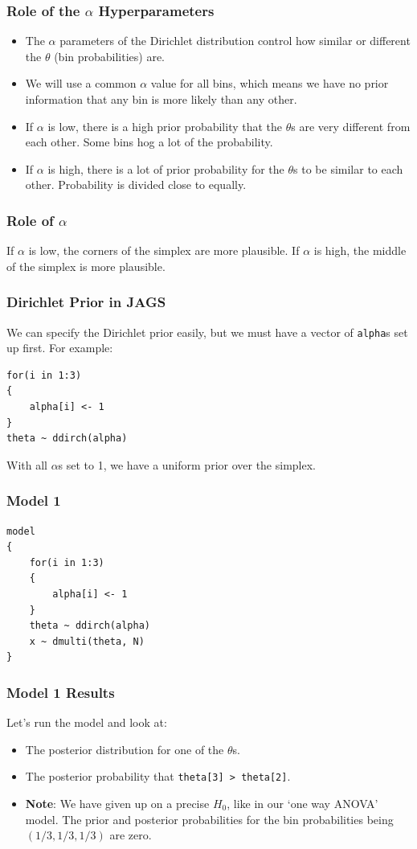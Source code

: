 \documentclass{beamer}
\begin{document}
\begin{frame}[fragile]
\frametitle{Role of the $\alpha$ Hyperparameters}
\begin{itemize}
\item The $\alpha$ parameters of the Dirichlet distribution control how similar
or different the $\theta$ (bin probabilities) are.\pause
\item We will use a common $\alpha$ value for all bins, which means we have no
prior information that any bin is more likely than any other.\pause
\item If $\alpha$ is low, there is a high prior probability that the $\theta$s
are very different from each other. Some bins hog a lot of the probability.\pause
\item If $\alpha$ is high, there is a lot of prior probability for the
$\theta$s to be similar to each other. Probability is divided close to equally.
\end{itemize}


\end{frame}


\begin{frame}[fragile]
\frametitle{Role of $\alpha$}
If $\alpha$ is low, the corners of the simplex are more plausible.
If $\alpha$ is high, the middle of the simplex is more plausible.
\end{frame}

\begin{frame}[fragile]
\frametitle{Dirichlet Prior in JAGS}
We can specify the Dirichlet prior easily, but we must have a vector of
\texttt{alpha}s set up first. For example:

\begin{verbatim}
for(i in 1:3)
{
    alpha[i] <- 1
}
theta ~ ddirch(alpha)
\end{verbatim}
\pause

With all $\alpha$s set to 1, we have a uniform prior over the simplex.
\end{frame}

\begin{frame}[fragile]
\frametitle{Model 1}
\begin{verbatim}
model
{
    for(i in 1:3)
    {
        alpha[i] <- 1
    }
    theta ~ ddirch(alpha)
    x ~ dmulti(theta, N)
}
\end{verbatim}
\end{frame}

\begin{frame}
\frametitle{Model 1 Results}
Let's run the model and look at:

\begin{itemize}
\item The posterior distribution for one of the $\theta$s.\pause
\item The posterior probability that \texttt{theta[3] > theta[2]}.\pause
\item {\bf Note}: We have given up on a precise $H_0$, like in our `one way ANOVA' model. The prior and posterior probabilities for the bin probabilities
being $(1/3, 1/3, 1/3)$ are zero.
\end{itemize}

\end{frame}
\end{document}
